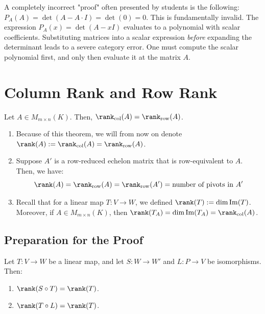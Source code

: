\begin{remark}\label{rem:lazy_proof}
  A completely incorrect "proof" often presented by students is the following: $P_A(A) = \det(A - A \cdot I) = \det(0) = 0$. This is fundamentally invalid. The expression $P_A(x) = \det(A - xI)$ evaluates to a polynomial with scalar coefficients. Substituting matrices into a scalar expression \textit{before} expanding the determinant leads to a severe category error. One must compute the scalar polynomial first, and only then evaluate it at the matrix $A$.
\end{remark}

\section{Column Rank and Row Rank}

\begin{theorem} \label{thm:17.c.1}
Let $A \in M_{m \times n}(K)$. Then, $\rank_{\text{col}}(A) = \rank_{\text{row}}(A)$.
\end{theorem}

\begin{remark}
\begin{enumerate}
    \item Because of this theorem, we will from now on denote $\rank(A) := \rank_{\text{col}}(A) = \rank_{\text{row}}(A)$.
    \item Suppose $A'$ is a row-reduced echelon matrix that is row-equivalent to $A$. Then, we have:
    \begin{equation*}
        \rank(A) = \rank_{\text{row}}(A) = \rank_{\text{row}}(A') = \text{number of pivots in } A'
    \end{equation*}
    \item Recall that for a linear map $T: V \to W$, we defined $\rank(T) := \dim \operatorname{Im}(T)$. Moreover, if $A \in M_{m \times n}(K)$, then $\rank(T_A) = \dim \operatorname{Im}(T_A) = \rank_{\text{col}}(A)$.
\end{enumerate}
\end{remark}

\subsection{Preparation for the Proof}

\begin{lemma} \label{lemma:17.c.2}
Let $T: V \to W$ be a linear map, and let $S: W \to W'$ and $L: P \to V$ be isomorphisms. Then:
\begin{enumerate}
    \item $\rank(S \circ T) = \rank(T)$.
    \item $\rank(T \circ L) = \rank(T)$.
\end{enumerate}
\end{lemma}

